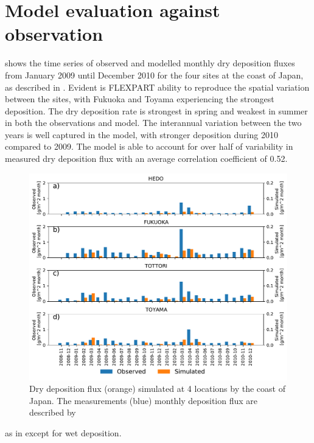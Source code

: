 \section{Model evaluation against observation}\label{sec:model_eval}

 shows the time series of observed and modelled monthly dry deposition fluxes from January 2009 until December 2010 for the four sites at the coast of Japan, as described in . 
Evident is FLEXPART ability to reproduce the spatial variation between the sites, with Fukuoka and Toyama experiencing the strongest deposition.
The dry deposition rate is strongest in spring and weakest in summer in both the observations and model. 
The interannual variation between the two years is well captured in the model, with stronger deposition during 2010 compared to 2009. 
The model is able to account for over half of variability in measured dry deposition flux with an average correlation coefficient of 0.52.
\begin{figure}[hptb]
    \centering
    \includegraphics[width=\textwidth]{texfiles/figs/monthly_accumulated_dry_depostion_japan.pdf}
    \caption{Dry deposition flux (orange) simulated at 4 locations by the coast of Japan. The measurements (blue) monthly deposition flux are described by \textcite{osada2014wet}}
    \label{fig:model_eval_dry_deposition}
\end{figure}
 as in  except for wet deposition.

